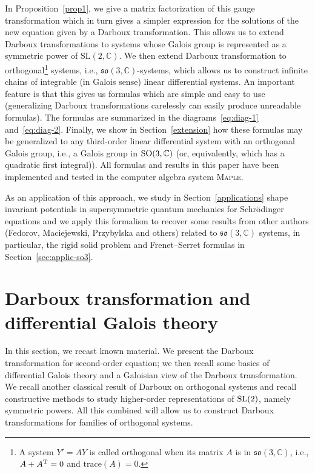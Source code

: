 \documentclass[pdftex]{sigma}%
\numberwithin{equation}{section}
\begin{document}
In Proposition~\ref{prop1}, we give a matrix factorization of this gauge transformation which in turn gives a simpler expression for the solutions of the new equation given by a Darboux transformation.
 This allows us to extend Darboux transformations to systems whose Galois group is represented as a symmetric power of $\mathrm{SL}(2,\mathbb{C})$. We then extend Darboux transformation to
orthogonal\footnote{A system $Y'=AY$ is called orthogonal when its matrix $A$ is in $\mathfrak{so}(3, \mathbb{C})$, i.e., $A+A^{\rm T}=0$ and $\textrm{trace}(A)=0$.} systems, i.e., $\mathfrak{so}(3, \mathbb{C})$-systems, which allows us to construct infinite chains of integrable (in Galois sense) linear differential systems.
 An important feature is that this gives us formulas which are simple and easy to use (generalizing Darboux transformations carelessly can easily produce unreadable formulas). The formulas are summarized in the diagrams~\eqref{eq:diag-1} and~\eqref{eq:diag-2}. Finally, we show in Section~\ref{extension} how these formulas may be generalized to any third-order linear differential system with an orthogonal Galois group, i.e., a Galois group in ${\rm SO}(3, \mathbb{C})$
 (or, equivalently, which has a quadratic first integral)). All formulas and results in this paper have been implemented and tested in the computer algebra system \textsc{Maple}.

 As an application of this approach, we study in Section~\ref{applications} shape invariant potentials in supersymmetric quantum mechanics for Schr\"odinger equations and we apply this formalism to recover some results from other authors (Fedorov, Maciejewski, Przybylska and others) related to $\mathfrak{so}(3, \mathbb{C})$ systems, in particular, the rigid solid
 problem and Frenet--Serret formulas in Section~\ref{sec:applic-so3}.

\section{Darboux transformation and differential Galois theory}
In this section, we recast known material. We present the Darboux transformation for second-order equation; we then recall some basics of differential Galois theory and a Galoisian view of the Darboux transformation. We recall another classical result of Darboux on orthogonal systems and recall constructive methods to study higher-order representations of ${\rm SL}(2)$, namely symmetric powers. All this combined will allow us to construct Darboux transformations for families of orthogonal systems.
\end{document}
